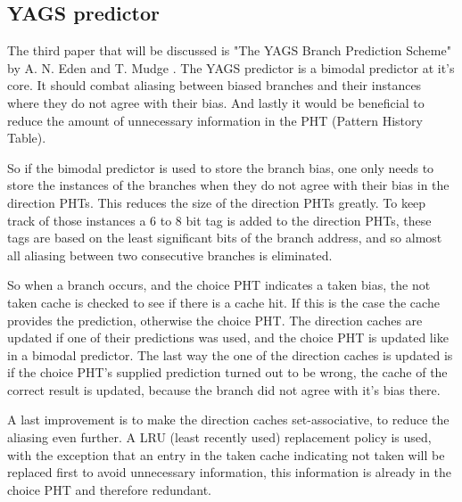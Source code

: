 \subsection{YAGS predictor}
\label{ssec:yags}
The third paper that will be discussed is "The YAGS Branch Prediction Scheme" by A. N. Eden and T. Mudge \cite{yags}.
The YAGS predictor is a bimodal predictor at it's core.
It should combat aliasing between biased branches and their instances where they do not agree with their bias.
And lastly it would be beneficial to reduce the amount of unnecessary information in the PHT (Pattern History Table).

So if the bimodal predictor is used to store the branch bias, one only needs to store the instances of the branches when they do not agree with their bias in the direction PHTs.
This reduces the size of the direction PHTs greatly.
To keep track of those instances a 6 to 8 bit tag is added to the direction PHTs, these tags are based on the least significant bits of the branch address, and so almost all aliasing between two consecutive branches is eliminated.

So when a branch occurs, and the choice PHT indicates a taken bias, the not taken cache is checked to see if there is a cache hit.
If this is the case the cache provides the prediction, otherwise the choice PHT.
The direction caches are updated if one of their predictions was used, and the choice PHT is updated like in a bimodal predictor.
The last way the one of the direction caches is updated is if the choice PHT's supplied prediction turned out to be wrong, the cache of the correct result is updated, because the branch did not agree with it's bias there.

A last improvement is to make the direction caches set-associative, to reduce the aliasing even further.
A LRU (least recently used) replacement policy is used, with the exception that an entry in the taken cache indicating not taken will be replaced first to avoid unnecessary information, this information is already in the choice PHT and therefore redundant.
